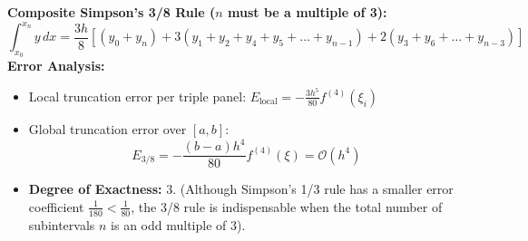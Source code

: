 \begin{theorembox}
\textbf{Composite Simpson's 3/8 Rule ($n$ must be a multiple of 3):}
\begin{equation}
    \boxed{
    \int_{x_0}^{x_n} y \, dx = \frac{3 h}{8} \left[ (y_0 + y_n) + 3(y_1 + y_2 + y_4 + y_5 + \dots + y_{n-1}) + 2(y_3 + y_6 + \dots + y_{n-3}) \right]
    }
\end{equation}
\textbf{Error Analysis:}
\begin{itemize}[noitemsep]
    \item Local truncation error per triple panel: $E_{\text{local}} = -\frac{3 h^5}{80} f^{(4)}(\xi_i)$
    \item Global truncation error over $[a, b]$:
    \begin{equation}
        \boxed{E_{3/8} = -\frac{(b-a) h^4}{80} f^{(4)}(\xi) = \mathcal{O}(h^4)}
    \end{equation}
    \item \textbf{Degree of Exactness:} $3$. (Although Simpson's 1/3 rule has a smaller error coefficient $\frac{1}{180} < \frac{1}{80}$, the 3/8 rule is indispensable when the total number of subintervals $n$ is an odd multiple of 3).
\end{itemize}
\end{theorembox}

